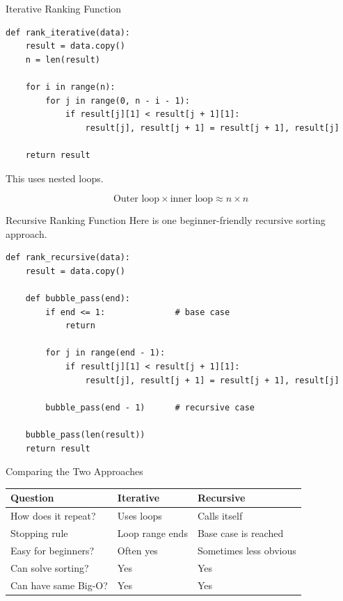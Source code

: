 \documentclass[11pt,aspectratio=43]{beamer}
\begin{document}
\begin{frame}[fragile]{Iterative Ranking Function}
  \begin{lstlisting}
def rank_iterative(data):
    result = data.copy()
    n = len(result)

    for i in range(n):
        for j in range(0, n - i - 1):
            if result[j][1] < result[j + 1][1]:
                result[j], result[j + 1] = result[j + 1], result[j]

    return result
  \end{lstlisting}

  \vspace{0.3cm}
  This uses nested loops.

  \[
    \text{Outer loop} \times \text{inner loop} \approx n \times n
  \]
\end{frame}

\begin{frame}[fragile]{Recursive Ranking Function}
  Here is one beginner-friendly recursive sorting approach.

  \begin{lstlisting}
def rank_recursive(data):
    result = data.copy()

    def bubble_pass(end):
        if end <= 1:              # base case
            return

        for j in range(end - 1):
            if result[j][1] < result[j + 1][1]:
                result[j], result[j + 1] = result[j + 1], result[j]

        bubble_pass(end - 1)      # recursive case

    bubble_pass(len(result))
    return result
  \end{lstlisting}
\end{frame}

\begin{frame}{Comparing the Two Approaches}
  \begin{center}
    \small
    \begin{tabular}{p{} p{} p{}}
      \toprule
      Question & Iterative & Recursive \\
      \midrule
      How does it repeat? & Uses loops & Calls itself \\
      Stopping rule & Loop range ends & Base case is reached \\
      Easy for beginners? & Often yes & Sometimes less obvious \\
      Can solve sorting? & Yes & Yes \\
      Can have same Big-O? & Yes & Yes \\
      \bottomrule
    \end{tabular}
  \end{center}
\end{frame}
\end{document}
